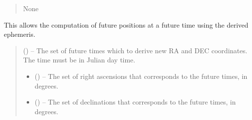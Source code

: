 \documentclass[letterpaper,11pt,english]{sphinxmanual}
\begin{document}
\begin{savenotes}
\begin{fulllineitems}
\begin{savenotes}
\begin{fulllineitems}
\begin{quote}
\begin{description}
\begin{itemize}
\end{itemize}

\sphinxAtStartPar
None

\end{description}\end{quote}

\end{fulllineitems}\end{savenotes}


\begin{savenotes}\begin{fulllineitems}
\label{\detokenize{code/opihiexarata.ephemeris.jplhorizons:opihiexarata.ephemeris.jplhorizons.JPLHorizonsWebAPIEngine.forward_ephemeris}}
\pysigstartsignatures
{}
\pysigstopsignatures
\sphinxAtStartPar
This allows the computation of future positions at a future time
using the derived ephemeris.
\begin{quote}\begin{description}
\sphinxAtStartPar
{} () – The set of future times which to derive new RA and DEC coordinates.
The time must be in Julian day time.

\sphinxAtStartPar
\begin{itemize}
\item {} 
\sphinxAtStartPar
{} () – The set of right ascensions that corresponds to the future times,
in degrees.

\item {} 
\sphinxAtStartPar
{} () – The set of declinations that corresponds to the future times, in
degrees.

\end{itemize}


\end{description}\end{quote}

\end{fulllineitems}\end{savenotes}


\end{fulllineitems}\end{savenotes}
\end{document}
